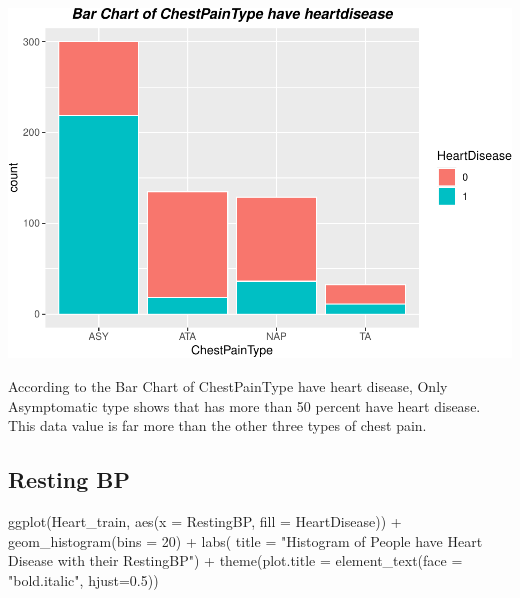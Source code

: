 \documentclass[
]{article}
\newenvironment{Shaded}{\begin{snugshade}}{\end{snugshade}}
\newcommand{\AttributeTok}[1]{\textcolor[rgb]{0.77,0.63,0.00}{#1}}
\newcommand{\DecValTok}[1]{\textcolor[rgb]{0.00,0.00,0.81}{#1}}
\newcommand{\FloatTok}[1]{\textcolor[rgb]{0.00,0.00,0.81}{#1}}
\newcommand{\FunctionTok}[1]{\textcolor[rgb]{0.00,0.00,0.00}{#1}}
\newcommand{\NormalTok}[1]{#1}
\newcommand{\SpecialCharTok}[1]{\textcolor[rgb]{0.00,0.00,0.00}{#1}}
\newcommand{\StringTok}[1]{\textcolor[rgb]{0.31,0.60,0.02}{#1}}
\begin{document}
\includegraphics{PSTAT-131--FINAL-PROJECT-_YIFAN-XU_files/figure-latex/unnamed-chunk-9-1.pdf}

According to the Bar Chart of ChestPainType have heart disease, Only
Asymptomatic type shows that has more than 50 percent have heart
disease. This data value is far more than the other three types of chest
pain.

\hypertarget{resting-bp}{%
\subsection{Resting BP}\label{resting-bp}}

\begin{Shaded}
\begin{Highlighting}[]
\FunctionTok{ggplot}\NormalTok{(Heart\_train, }\FunctionTok{aes}\NormalTok{(}\AttributeTok{x =}\NormalTok{ RestingBP, }\AttributeTok{fill =}\NormalTok{ HeartDisease)) }\SpecialCharTok{+}
  \FunctionTok{geom\_histogram}\NormalTok{(}\AttributeTok{bins =} \DecValTok{20}\NormalTok{) }\SpecialCharTok{+}
  \FunctionTok{labs}\NormalTok{(}
    \AttributeTok{title =} \StringTok{"Histogram of People have Heart Disease with their RestingBP"}\NormalTok{) }\SpecialCharTok{+}
    \FunctionTok{theme}\NormalTok{(}\AttributeTok{plot.title =} \FunctionTok{element\_text}\NormalTok{(}\AttributeTok{face =} \StringTok{"bold.italic"}\NormalTok{, }\AttributeTok{hjust=}\FloatTok{0.5}\NormalTok{))}
\end{Highlighting}
\end{Shaded}
\end{document}
